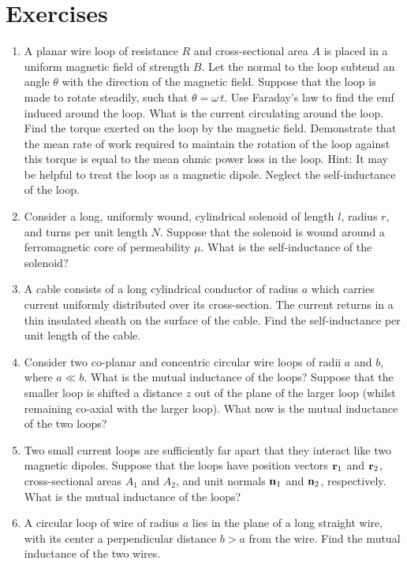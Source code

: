 {\small
\section{Exercises}
\renewcommand{\theenumi}{7.\arabic{enumi}}
\begin{enumerate}
\item A planar wire loop of resistance $R$ and cross-sectional area $A$ is placed in a uniform magnetic
field of strength $B$. Let the normal to the loop subtend an angle $\theta$ with the direction of the magnetic field. Suppose that the loop is made to
rotate
steadily, such that $\theta = \omega\,t$. Use Faraday's law to find the
emf induced around the loop. What is the current circulating around the loop. 
Find 
the torque exerted on the loop by the magnetic field. Demonstrate that the
mean rate of work required to maintain the rotation of the loop against
this torque is equal to the mean ohmic power loss in the loop.
Hint: It may be helpful
to treat the loop as a magnetic dipole. Neglect the self-inductance of the loop.
\item Consider a long, uniformly wound, cylindrical solenoid of length $l$,
radius $r$, and turns per unit length $N$. Suppose that the solenoid is
wound around a ferromagnetic core of permeability $\mu$. What is the
self-inductance of the solenoid?
\item A cable consists of a long cylindrical conductor  of radius $a$ which carries current uniformly
distributed over its cross-section. The current returns in a thin insulated sheath  on the surface of the cable. Find the self-inductance per unit length
of the cable.
\item Consider two co-planar and concentric circular wire loops of radii
$a$ and $b$, where $a\ll b$. What is the mutual inductance of the loops?
Suppose that the smaller loop is shifted a distance $z$ out of the
plane of the larger loop (whilst remaining co-axial with the larger loop).
What now is the mutual inductance of the two loops?
\item Two small current loops are sufficiently far apart that they interact
like two magnetic dipoles. Suppose that the loops have position vectors ${\bf r}_1$ and ${\bf r}_2$, cross-sectional
areas $A_1$ and $A_2$, and unit normals ${\bf n}_1$ and ${\bf n}_2$, respectively. What is the mutual inductance of the loops?
\item A circular loop of wire of radius $a$ lies in the plane of a long
straight wire, with its center a perpendicular distance $b > a$ from the wire.
Find the mutual inductance of the two wires.

\end{enumerate}}
